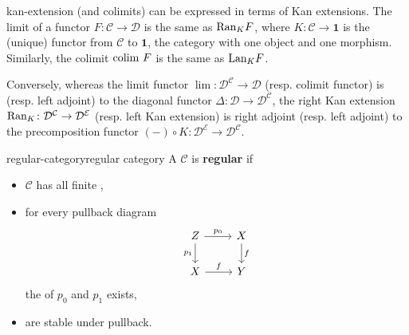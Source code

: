 \begin{example}{kan-extension}
     (and colimits) can be expressed in terms of Kan extensions. The limit of a functor $F \colon \mathcal{C} \to \mathcal{D}$ is the same as $\textup{Ran}_K F$, where $K \colon \mathcal{C} \to \textbf{1}$ is the (unique) functor from $\mathcal{C}$ to $\textbf{1}$, the category with one object and one morphism. Similarly, the colimit $\textup{colim } F$ is the same as $\textup{Lan}_K F$.
    
    Conversely, whereas the limit functor $\lim \colon \mathcal{D}^\mathcal{C} \to \mathcal{D}$ (resp. colimit functor) is  (resp. left adjoint) to the diagonal functor $\Delta \colon \mathcal{D} \to \mathcal{D}^\mathcal{C}$, the right Kan extension $\textup{Ran}_K \colon \mathcal{D}^\mathcal{C} \to \mathcal{D}^\mathcal{E}$ (resp. left Kan extension) is right adjoint (resp. left adjoint) to the precomposition functor $(-) \circ K \colon \mathcal{D}^\mathcal{E} \to \mathcal{D}^\mathcal{C}$.
\end{example}

\begin{topic}{regular-category}{regular category}
    A  $\mathcal{C}$ is \textbf{regular} if
    \begin{itemize}
        \item $\mathcal{C}$ has all finite ,
        \item for every pullback diagram
        \[ \svg \begin{tikzcd} Z \arrow[swap]{d}{p_1} \arrow{r}{p_0} & X \arrow{d}{f} \\ X \arrow{r}{f} & Y \end{tikzcd} \]
        the  of $p_0$ and $p_1$ exists,
        \item {} are stable under pullback.
    \end{itemize}
\end{topic}

